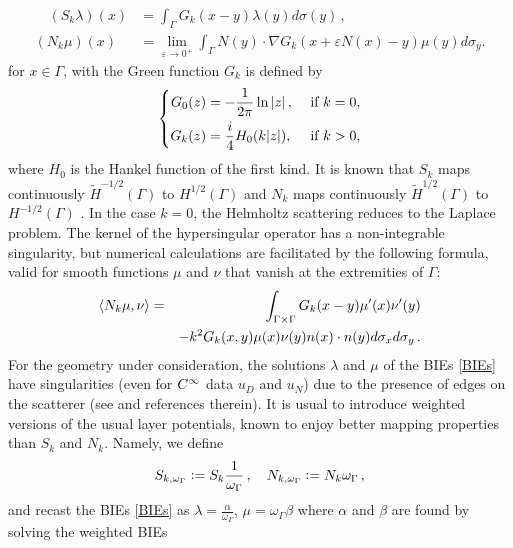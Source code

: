 \documentclass[a4paper]{article}
\begin{document}
\begin{equation}
\begin{split}
\quad (S_k \lambda)(x) &= \int_{\Gamma} G_k(x-y) \lambda(y) d\sigma(y)\,,\\ 
(N_k \mu) (x) &= \lim_{\varepsilon \to 0^+} \int_{\Gamma} N(y) \cdot \nabla G_k(x + \varepsilon N(x) - y) \mu(y) d\sigma_y.
\end{split}
\label{defNk}
\end{equation}
for $x \in \Gamma$, with the Green function $G_k$ is defined by
\begin{equation}
\left\{
\begin{aligned}
G_0(z) &= -\dfrac{1}{2\pi} \ln \left\lvert z \right\rvert, && \text{ if } k= 0,\\
G_k(z) &= \frac{i}{4}H_0(k|z|), && \text{ if } k > 0,
\end{aligned} 
\right.
\end{equation} 
where $H_0$ is the Hankel function of the first kind. It is known that $S_k$ maps continuously $\tilde{H}^{-1/2}(\Gamma)$ to $H^{1/2}(\Gamma)$ \cite[Theorem 1.8]{wendland1990hypersingular} and $N_k$ maps continuously $\tilde{H}^{1/2}(\Gamma)$ to $H^{-1/2}(\Gamma)$ \cite[Theorem 1.4]{wendland1990hypersingular}. In the case $k=0$, the Helmholtz scattering reduces to the Laplace problem. The kernel of the hypersingular operator has a non-integrable singularity, but numerical calculations are facilitated by the following formula, valid for smooth functions 
$\mu$ and $\nu$ that vanish at the extremities of $\Gamma$: 
\begin{eqnarray}
\label{NkenfonctiondeSk}
\left\langle N_k \mu,\nu\right\rangle &=& \int_{\Gamma\times \Gamma} G_k(x-y) \mu'(x) \nu'(y) \nonumber\\
&& - k^2 G_k(x,y) \mu(x) \nu(y) n(x) \cdot n(y) d\sigma_x d\sigma_y\,.
\end{eqnarray}
For the geometry under consideration, the solutions $\lambda$ and $\mu$ of the BIEs \eqref{BIEs} have singularities (even for $C^{\infty}$ data $u_D$ and $u_N$) due to the presence of edges on the scatterer (see \cite{alouges2018new} and references therein). It is usual to introduce weighted versions of the usual layer potentials, known to enjoy better mapping properties than $S_k$ and $N_k$. Namely, we define
\begin{equation}
\label{weightedBIOs}
S_{k,\omega_\Gamma} \mathrel{\mathop:}= S_k \frac{1}{\omega_\Gamma}\,,\quad N_{k,\omega_\Gamma} \mathrel{\mathop:}= N_k \omega_\Gamma\,,
\end{equation}
and recast the BIEs \eqref{BIEs} as $\lambda = \frac{\alpha}{\omega_\Gamma}$, $\mu = \omega_\Gamma \beta$ where $\alpha$ and $\beta$ are found by solving the weighted BIEs
\end{document}
